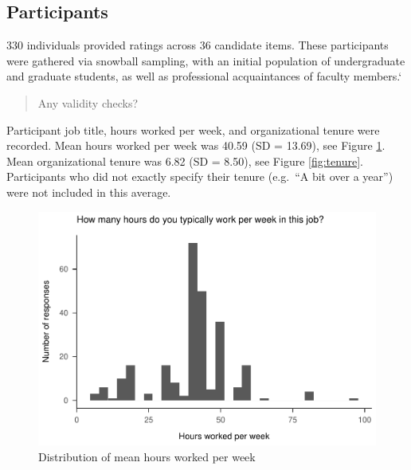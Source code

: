 \documentclass[
  english,
  man]{apa6}
\begin{document}
\hypertarget{participants}{%
\subsection{Participants}\label{participants}}

330 individuals provided ratings across 36 candidate items. These participants were gathered via snowball sampling, with an initial population of undergraduate and graduate students, as well as professional acquaintances of faculty members.`

\begin{quote}
Any validity checks?
\end{quote}

Participant job title, hours worked per week, and organizational tenure were recorded. Mean hours worked per week was 40.59 (SD = 13.69), see Figure \ref{fig:hours}. Mean organizational tenure was 6.82 (SD = 8.50), see Figure \ref{fig:tenure}. Participants who did not exactly specify their tenure (e.g.~\enquote{A bit over a year}) were not included in this average.

\begin{figure}
\centering
\includegraphics{SIOPpapaja_files/figure-latex/hours-1.pdf}
\caption{\label{fig:hours}Distribution of mean hours worked per week}
\end{figure}
\end{document}
